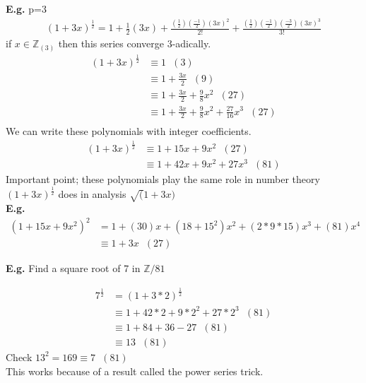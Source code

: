 \documentclass[11pt]{article}
\begin{document}
\textbf{E.g.} p=3
\begin{align*}
	(1+3x)^{\frac{1}{2}} = 1 + \frac{1}{2}(3x) + \frac{(\frac{1}{2}) (\frac{-1}{2}) (3x)^2}{2!} + \frac{(\frac{1}{2}) (\frac{-1}{2}) (\frac{-3}{2})(3x)^3 }{3!}
\end{align*}
	if $x \in \mathbb{Z}_{(3)}$ then this series converge 3-adically.
	\newpage
\begin{align*}
	(1+3x)^{\frac{1}{2}} &\equiv 1 \hspace{7pt} (3)\\
	&\equiv 1 + \frac{3x}{2} \hspace{7pt} (9)\\
	&\equiv 1 + \frac{3x}{2} + \frac{9}{8}x^2\hspace{7pt} (27)\\
	&\equiv 1 + \frac{3x}{2} + \frac{9}{8}x^2 + \frac{27}{16}x^3 \hspace{7pt} (27)\\
\end{align*}
	We can write these polynomials with integer coefficients.
\begin{align*}
	(1+3x)^{\frac{1}{2}} &\equiv 1 + 15x + 9x^2 \hspace{7pt} (27)\\
	&\equiv 1 + 42x + 9x^2 + 27x^3 \hspace{7pt} (81)
\end{align*}
Important point; these polynomials play the same role in number theory $(1+3x)^{\frac{1}{2}}$ does in analysis $\sqrt(1+3x)$\\
\textbf{E.g.} 
\begin{align*}
	(1+15x+9x^2)^2 &= 1 + (30)x+(18+15^2)x^2 + (2*9*15)x^3 + (81)x^4\\
	&\equiv 1+3x \hspace{7pt} (27)
\end{align*}
	
	\textbf{E.g.} Find a square root of 7 in $\mathbb{Z}/81$

\begin{align*}
	7^\frac{1}{2} &= (1+3*2)^{\frac{1}{2}}\\
	&\equiv 1 + 42*2 + 9*2^2 + 27*2^3 \hspace{7pt} (81) \\
	&\equiv 1 + 84 + 36-27 \hspace{7pt} (81)\\
	&\equiv 13\hspace{7pt} (81)
\end{align*}
	Check $13^2 = 169 \equiv 7\hspace{7pt} (81)$\\[0.5em]
	This works because of a result called the power series trick.\\[1em]
	
\end{document}

